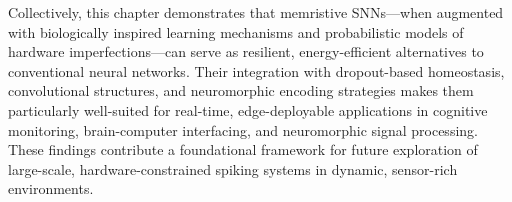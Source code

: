 
\noindent Collectively, this chapter demonstrates that memristive SNNs—when augmented with biologically inspired learning mechanisms and probabilistic models of hardware imperfections—can serve as resilient, energy-efficient alternatives to conventional neural networks. Their integration with dropout-based homeostasis, convolutional structures, and neuromorphic encoding strategies makes them particularly well-suited for real-time, edge-deployable applications in cognitive monitoring, brain-computer interfacing, and neuromorphic signal processing. These findings contribute a foundational framework for future exploration of large-scale, hardware-constrained spiking systems in dynamic, sensor-rich environments.\\